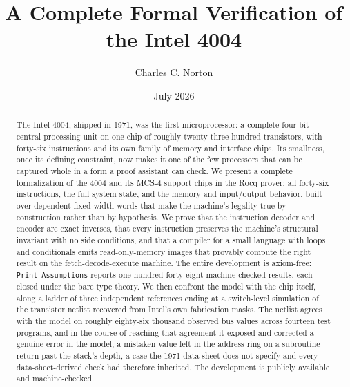 \documentclass[11pt]{amsart}
\theoremstyle{plain}
\theoremstyle{definition}
\newcommand{\code}[1]{\texttt{#1}}
\begin{document}
\title{A Complete Formal Verification of the Intel 4004}
\author{Charles C. Norton}
\date{July 2026}

\begin{abstract}
The Intel 4004, shipped in 1971, was the first microprocessor: a complete four-bit central processing unit on one chip of roughly twenty-three hundred transistors, with forty-six instructions and its own family of memory and interface chips. Its smallness, once its defining constraint, now makes it one of the few processors that can be captured whole in a form a proof assistant can check. We present a complete formalization of the 4004 and its MCS-4 support chips in the Rocq prover: all forty-six instructions, the full system state, and the memory and input/output behavior, built over dependent fixed-width words that make the machine's legality true by construction rather than by hypothesis. We prove that the instruction decoder and encoder are exact inverses, that every instruction preserves the machine's structural invariant with no side conditions, and that a compiler for a small language with loops and conditionals emits read-only-memory images that provably compute the right result on the fetch-decode-execute machine. The entire development is axiom-free: \code{Print Assumptions} reports one hundred forty-eight machine-checked results, each closed under the bare type theory. We then confront the model with the chip itself, along a ladder of three independent references ending at a switch-level simulation of the transistor netlist recovered from Intel's own fabrication masks. The netlist agrees with the model on roughly eighty-six thousand observed bus values across fourteen test programs, and in the course of reaching that agreement it exposed and corrected a genuine error in the model, a mistaken value left in the address ring on a subroutine return past the stack's depth, a case the 1971 data sheet does not specify and every data-sheet-derived check had therefore inherited. The development is publicly available and machine-checked.
\end{abstract}

\maketitle
\end{document}
